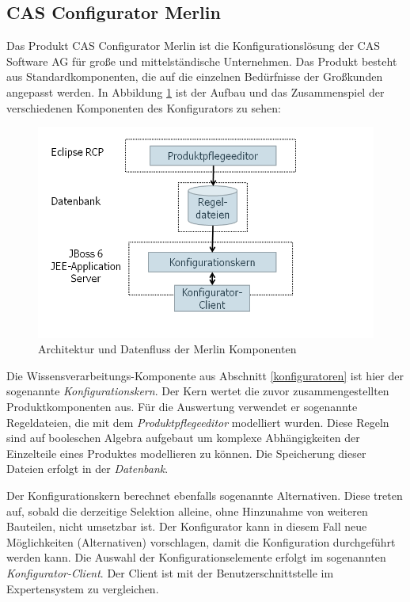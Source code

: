 \subsection{CAS Configurator Merlin} \label{configurator}
Das Produkt CAS Configurator Merlin ist die Konfigurationslösung der CAS Software AG für große und mittelständische Unternehmen. Das Produkt besteht aus Standardkomponenten, die auf die einzelnen Bedürfnisse der Großkunden angepasst werden. In Abbildung \ref{airbus_structure} ist der Aufbau und das Zusammenspiel der verschiedenen Komponenten des Konfigurators zu sehen: \par
\begin{figure} [H]
\centering
\includegraphics[width=\hsize]{images/AirbusAufbau}
\caption{Architektur und Datenfluss der Merlin Komponenten}
\label{airbus_structure}
\end{figure}
Die Wissensverarbeitungs-Komponente aus Abschnitt \ref{konfiguratoren} ist hier der sogenannte \textit{Konfigurationskern}. Der Kern wertet die zuvor zusammengestellten Produktkomponenten aus. Für die Auswertung verwendet er sogenannte Regeldateien, die mit dem \textit{Produktpflegeeditor} modelliert wurden. Diese Regeln sind auf booleschen Algebra aufgebaut um komplexe Abhängigkeiten der Einzelteile eines Produktes modellieren zu können. Die Speicherung dieser Dateien erfolgt in der \textit{Datenbank}.
\par
 Der Konfigurationskern berechnet ebenfalls sogenannte Alternativen. Diese treten auf, sobald die derzeitige Selektion alleine, ohne Hinzunahme von weiteren Bauteilen, nicht umsetzbar ist. Der Konfigurator kann in diesem Fall neue Möglichkeiten (Alternativen) vorschlagen, damit die Konfiguration durchgeführt werden kann. Die Auswahl der Konfigurationselemente erfolgt im sogenannten \textit{Konfigurator-Client}. Der Client ist mit der Benutzerschnittstelle im Expertensystem zu vergleichen. \par

